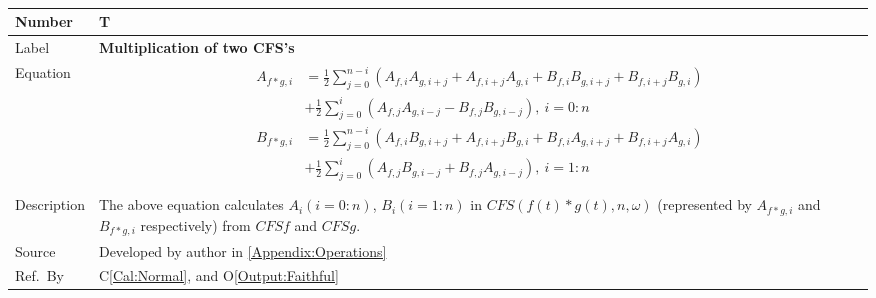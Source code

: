 \documentclass[12pt]{article}
\newcommand{\colAwidth}{0.13\textwidth}
\newcommand{\colBwidth}{0.82\textwidth}
\newcounter{theorynum} %
\newcommand{\calref}[1]{C\ref{#1}}
\newcommand{\oref}[1]{O\ref{#1}}
\begin{document}
~\newline

\noindent
\begin{minipage}{\textwidth}
	\renewcommand*{\arraystretch}{1.5}
	\begin{tabular}{| p{\colAwidth} | p{\colBwidth}|}
		\hline
		\rowcolor[gray]{0.9}
		Number& T{theorynum}\thetheorynum \label{T:Multiplication}\\
		\hline
		Label&\bf Multiplication of two CFS's\\
		\hline
		Equation&  
		\begin{equation}
		\begin{aligned}
		A_{f*g, i}&=\frac{1}{2}\sum_{j=0}^{n-i}(A_{f,i}A_{g,i+j}
		+A_{f, i+j}A_{g, i}+B_{f,i}B_{g,i+j}+B_{f,i+j}B_{g,i})\\
		&+\frac{1}{2}\sum_{j=0}^{i}(A_{f,j}A_{g,i-j}-B_{f,j}B_{g,i-j}),
		~i=0:n\\
		B_{f*g, i}&=\frac{1}{2}\sum_{j=0}^{n-i}(A_{f,i}B_{g,i+j}
		+A_{f, i+j}B_{g, i}+B_{f,i}A_{g,i+j}+B_{f,i+j}A_{g,i})\\
		&+\frac{1}{2}\sum_{j=0}^{i}(A_{f,j}B_{g,i-j}+B_{f,j}A_{g,i-j}),
		~i=1:n\\
		\end{aligned}
		\end{equation}\\
		\hline
		Description & The above equation calculates $A_i(i=0:n)$, 
		$B_i(i=1:n)$ in $\mathit{CFS}(f(t)*g(t), n, \omega)$ 
		(represented by $A_{f*g, i}$ and $B_{f*g, i}$ respectively) 
		from $\mathit{CFSf}$ and $\mathit{CFSg}$.\\
		\hline
		Source & Developed by author in \autoref{Appendix:Operations}\\
		\hline
		Ref.\ By &  \calref{Cal:Normal}, 
		and \oref{Output:Faithful}\\
		\hline
	\end{tabular}
\end{minipage}\\
\end{document}
